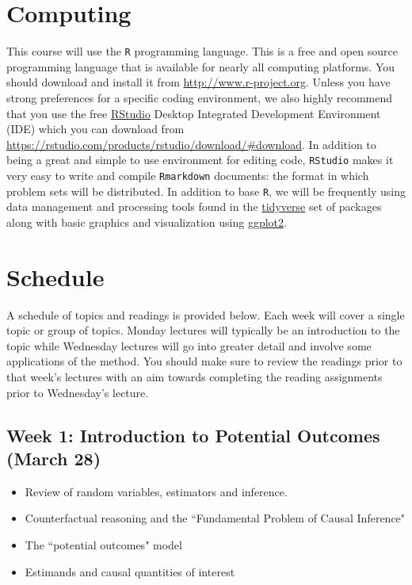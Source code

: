 \documentclass[11pt, article, oneside]{memoir}
\theoremstyle{Assumption}
\begin{document}
\section*{Computing}

This course will use the \texttt{R} programming language. This is a free and open source programming language that is available for nearly all computing platforms. You should download and install it from \url{http://www.r-project.org}. Unless you have strong preferences for a specific coding environment, we also highly recommend that you use the free \href{https://rstudio.com}{RStudio} Desktop Integrated Development Environment (IDE) which you can download from \url{https://rstudio.com/products/rstudio/download/#download}. In addition to being a great and simple to use environment for editing code, \texttt{RStudio} makes it very easy to write and compile \texttt{Rmarkdown} documents: the format in which problem sets will be distributed. In addition to base \texttt{R}, we will be frequently using data management and processing tools found in the \href{https://www.tidyverse.org/}{tidyverse} set of packages along with basic graphics and visualization using \href{https://ggplot2.tidyverse.org/}{ggplot2}. 


\section*{Schedule}

A schedule of topics and readings is provided below. Each week will cover a single topic or group of topics. Monday lectures will typically be an introduction to the topic while Wednesday lectures will go into greater detail and involve some applications of the method. You should make sure to review the readings prior to that week's lectures with an aim towards completing the reading assignments prior to Wednesday's lecture.

\subsection{Week 1: Introduction to Potential Outcomes (March 28)}

\begin{itemize}
  \item Review of random variables, estimators and inference.
  \item Counterfactual reasoning and the ``Fundamental Problem of Causal Inference"
  \item The ``potential outcomes" model
  \item Estimands and causal quantities of interest
\end{itemize}
\end{document}
